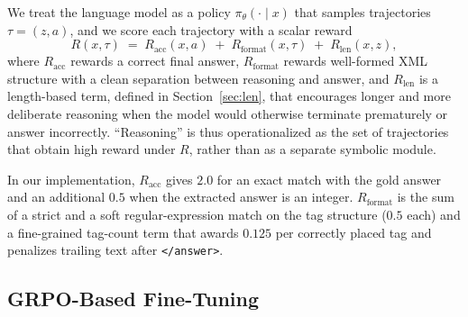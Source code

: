 \documentclass{article}
\begin{document}
We treat the language model as a policy $\pi_{\theta}(\cdot \mid x)$ that samples trajectories $\tau = (z, a)$, and we score each trajectory with a scalar reward
\begin{equation}
    R(x,\tau) \;=\; R_{\text{acc}}(x,a) \;+\; R_{\text{format}}(x,\tau) \;+\; R_{\text{len}}(x,z),
    \label{eq:reward}
\end{equation}
where $R_{\text{acc}}$ rewards a correct final answer, $R_{\text{format}}$ rewards well-formed XML structure with a clean separation between reasoning and answer, and $R_{\text{len}}$ is a length-based term, defined in Section~\ref{sec:len}, that encourages longer and more deliberate reasoning when the model would otherwise terminate prematurely or answer incorrectly. ``Reasoning'' is thus operationalized as the set of trajectories that obtain high reward under $R$, rather than as a separate symbolic module.

In our implementation, $R_{\text{acc}}$ gives $2.0$ for an exact match with the gold answer and an additional $0.5$ when the extracted answer is an integer. $R_{\text{format}}$ is the sum of a strict and a soft regular-expression match on the tag structure ($0.5$ each) and a fine-grained tag-count term that awards $0.125$ per correctly placed tag and penalizes trailing text after \texttt{</answer>}.

\subsection{GRPO-Based Fine-Tuning}
\end{document}

